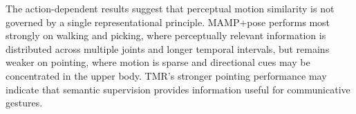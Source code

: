 \documentclass[letterpaper]{article} %
\begin{document}
The action-dependent results suggest that perceptual motion similarity is not governed by a single representational principle. MAMP+pose performs most strongly on walking and picking, where perceptually relevant information is distributed across multiple joints and longer temporal intervals, but remains weaker on pointing, where motion is sparse and directional cues may be concentrated in the upper body. TMR’s stronger pointing performance may indicate that semantic supervision provides information useful for communicative gestures.



\end{document}
